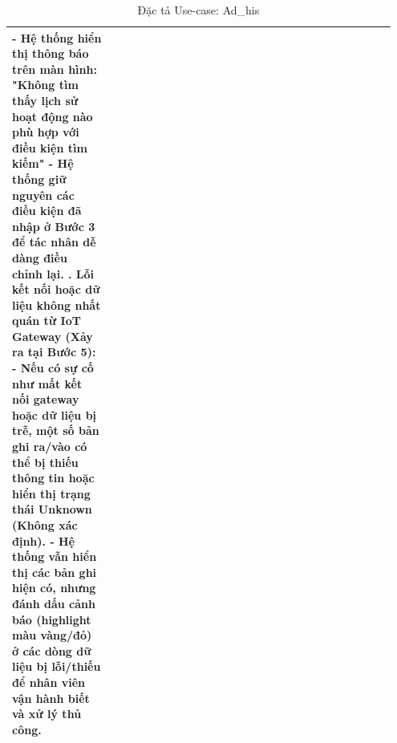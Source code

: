 \begin{table}[htpb]
\begin{tabular}{|p{0.25\linewidth}|p{0.7\linewidth}|}
- Hệ thống hiển thị thông báo trên màn hình: "Không tìm thấy lịch sử hoạt động nào phù hợp với điều kiện tìm kiếm" \newline
- Hệ thống giữ nguyên các điều kiện đã nhập ở Bước 3 để tác nhân dễ dàng điều chỉnh lại. \newline
2. Lỗi kết nối hoặc dữ liệu không nhất quán từ IoT Gateway (Xảy ra tại Bước 5): \newline
- Nếu có sự cố như mất kết nối gateway hoặc dữ liệu bị trễ, một số bản ghi ra/vào có thể bị thiếu thông tin hoặc hiển thị trạng thái Unknown (Không xác định). \newline
- Hệ thống vẫn hiển thị các bản ghi hiện có, nhưng đánh dấu cảnh báo (highlight màu vàng/đỏ) ở các dòng dữ liệu bị lỗi/thiếu để nhân viên vận hành biết và xử lý thủ công.\\ \hline
\end{tabular}
\caption{Đặc tả Use-case: Ad\_his}
\label{tab:uc_mem_pay}
\end{table}